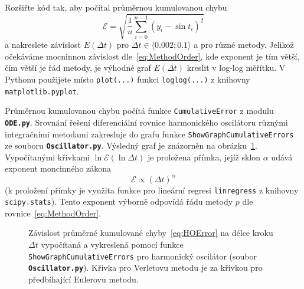 \documentclass[a4paper,11pt,twoside]{article}
\def\code#1{\textnormal{\texttt{#1}}}
\def\file#1{\textnormal{\textbf{\texttt{#1}}}}
\begin{document}
    \begin{task}
        Rozšiřte kód tak, aby počítal průměrnou kumulovanou chybu
        \begin{equation}\label{eq:HOError}
            \mathcal{E}=\sqrt{\frac{1}{n}\sum_{i=0}^{n-1}\left(y_{i}-\sin t_{i}\right)^{2}}
        \end{equation}
        a nakreslete závislost $E(\Delta t)$ pro $\Delta t\in\langle0.002;0.1\rangle$ a pro různé metody.
        Jelikož očekáváme mocninnou závislost dle~\eqref{eq:MethodOrder}, kde exponent je tím větší, čím větší je řád metody, je výhodné graf $E(\Delta t)$ kreslit v log-log měřítku.
        V Pythonu použijete místo \textnormal{\texttt{plot(...)}} funkci \textnormal{\texttt{loglog(...)}} z knihovny \textnormal{\texttt{matplotlib.pyplot}}.
    \end{task}

    \begin{solution}
        Průměrnou kumulovanou chybu počítá funkce \code{CumulativeError} z modulu \file{ODE.py}.
        Srovnání řešení diferenciální rovnice harmonického oscilátoru různými integračními metodami zakresluje do grafu funkce \code{ShowGraphCumulativeErrors} ze souboru \file{Oscillator.py}.
        Výsledný graf je znázorněn na obrázku~\ref{fig:HOError}.
        Vypočítanými křivkami $\ln\mathcal{E}(\ln\Delta t)$ je proložena přímka, jejíž sklon $\alpha$ udává exponent moncinného zákona
        \begin{equation}
            \mathcal{E}\propto\left(\Delta t\right)^{\alpha}
        \end{equation} 
        (k proložení přímky je využita funkce pro lineární regresi \code{linregress} z knihovny \code{scipy.stats}).
        Tento exponent výborně odpovídá řádu metody $p$ dle rovnice~\eqref{eq:MethodOrder}.

        \begin{figure}[!htbp]\label{fig:HOError}
            \centering
			\caption{
                \protect\small
                Závislost průměrné kumulované chyby~\eqref{eq:HOError} na délce kroku $\Delta t$ vypočítaná a vykreslená pomocí funkce \code{ShowGraphCumulativeErrors} pro harmonický oscilátor (soubor \file{Oscillator.py}).
                Křivka pro Verletovu metodu je  za křivkou pro předbíhající Eulerovu metodu.
			}	
		\end{figure}
    \end{solution}
\end{document}
